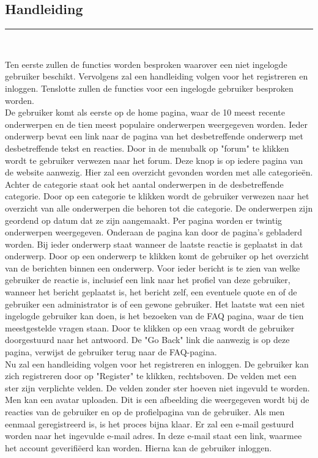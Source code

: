 \documentclass[a4paper,12pt]{article}
\newcommand{\HRule}{\rule{\linewidth}{0.5mm}}
\begin{document}
\begin{center}
\section[Handleiding]{Handleiding}
\HRule \\[0.5cm]
\end{center}
Ten eerste zullen de functies worden besproken waarover een niet ingelogde gebruiker beschikt. Vervolgens zal een handleiding volgen voor het registreren en inloggen. Tenslotte zullen de functies voor een ingelogde gebruiker besproken worden.\\
De gebruiker komt als eerste op de home pagina, waar de 10 meest recente onderwerpen en de tien meest populaire onderwerpen weergegeven worden. Ieder onderwerp bevat een link naar de pagina van het desbetreffende onderwerp met desbetreffende tekst en reacties.
Door in de menubalk op "forum" te klikken wordt te gebruiker verwezen naar het forum. Deze knop is op iedere pagina van de website aanwezig. Hier zal een overzicht gevonden worden met alle categorie\"en.  Achter de categorie staat ook het aantal onderwerpen in de desbetreffende categorie. Door op een categorie te klikken wordt de gebruiker verwezen naar het overzicht van alle onderwerpen die behoren tot die categorie. De onderwerpen zijn geordend op datum dat ze zijn aangemaakt. Per pagina worden er twintig onderwerpen weergegeven. Onderaan de pagina kan door de pagina's gebladerd worden. Bij ieder onderwerp staat wanneer de laatste reactie is geplaatst in dat onderwerp. Door op een onderwerp te klikken komt de gebruiker op het overzicht van de berichten binnen een onderwerp. Voor ieder bericht is te zien van welke gebruiker de reactie is, inclusief een link naar het profiel van deze gebruiker, wanneer het bericht geplaatst is, het bericht zelf, een eventuele quote en of de gebruiker een administrator is of een gewone gebruiker. Het laatste wat een niet ingelogde gebruiker kan doen, is het bezoeken van de FAQ pagina, waar de tien meestgestelde vragen staan. Door te klikken op een vraag wordt de gebruiker doorgestuurd naar het antwoord. De "Go Back" link die aanwezig is op deze pagina, verwijst de gebruiker terug naar de FAQ-pagina.\\
Nu zal een handleiding volgen voor het registreren en inloggen. De gebruiker kan zich registreren door op "Register" te klikken, rechtsboven. De velden met een ster zijn verplichte velden. De velden zonder ster hoeven niet ingevuld te worden. Men kan een avatar uploaden. Dit is een afbeelding die weergegeven wordt bij de reacties van de gebruiker en op de profielpagina van de gebruiker. Als men eenmaal geregistreerd is, is het proces bijna klaar. Er zal een e-mail gestuurd worden naar het ingevulde e-mail adres. In deze e-mail staat een link, waarmee het account geverifi\"eerd kan worden. Hierna kan de gebruiker inloggen. \\
\end{document}
